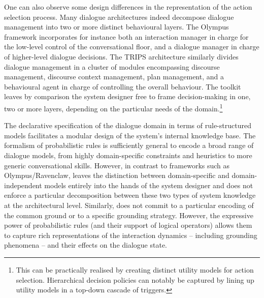 One can also observe some design differences in the representation of the action selection process. Many dialogue architectures indeed decompose dialogue management into two or more distinct behavioural layers.  The Olympus framework incorporates for instance both an interaction manager in charge for the low-level control of the conversational floor, and a dialogue manager in charge of higher-level dialogue decisions.  The TRIPS architecture similarly divides dialogue management in a cluster of modules encompassing discourse management, discourse context management, plan management, and a behavioural agent in charge of controlling the overall behaviour. The \opendial{} toolkit leaves by comparison the system designer free to frame decision-making in one, two or more layers, depending on the particular needs of the domain.\footnote{This can be practically realised by creating distinct utility models for action selection.  Hierarchical decision policies can notably be captured by lining up utility models in a top-down cascade of triggers.} 

The declarative specification of the dialogue domain in terms of rule-structured models facilitates a modular design of the system's internal knowledge base.  The formalism of probabilistic rules is sufficiently general to encode a broad range of dialogue models, from highly domain-specific constraints and heuristics to more generic conversational skills. However, in contrast to frameworks such as Olympus/Ravenclaw, \opendial{} leaves the distinction between domain-specific and domain-independent models entirely into the hands of the system designer and does not enforce a particular decomposition between these two types of system knowledge  at the architectural level. Similarly, \opendial{} does not commit to a particular encoding of the common ground or to a specific grounding strategy.  However, the expressive power of probabilistic rules (and their support of logical operators) allows them to capture rich representations of the interaction dynamics -- including grounding phenomena -- and their effects on the dialogue state. 



